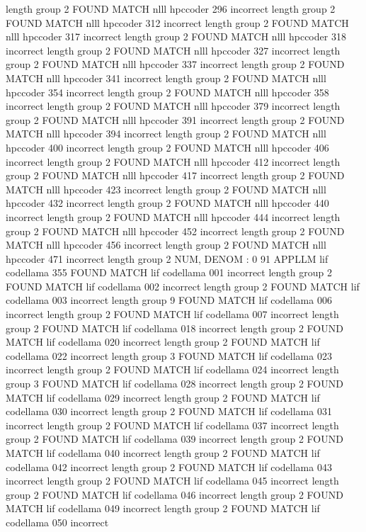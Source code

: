 length group  2
FOUND MATCH nlll hpccoder 296 incorrect
length group  2
FOUND MATCH nlll hpccoder 312 incorrect
length group  2
FOUND MATCH nlll hpccoder 317 incorrect
length group  2
FOUND MATCH nlll hpccoder 318 incorrect
length group  2
FOUND MATCH nlll hpccoder 327 incorrect
length group  2
FOUND MATCH nlll hpccoder 337 incorrect
length group  2
FOUND MATCH nlll hpccoder 341 incorrect
length group  2
FOUND MATCH nlll hpccoder 354 incorrect
length group  2
FOUND MATCH nlll hpccoder 358 incorrect
length group  2
FOUND MATCH nlll hpccoder 379 incorrect
length group  2
FOUND MATCH nlll hpccoder 391 incorrect
length group  2
FOUND MATCH nlll hpccoder 394 incorrect
length group  2
FOUND MATCH nlll hpccoder 400 incorrect
length group  2
FOUND MATCH nlll hpccoder 406 incorrect
length group  2
FOUND MATCH nlll hpccoder 412 incorrect
length group  2
FOUND MATCH nlll hpccoder 417 incorrect
length group  2
FOUND MATCH nlll hpccoder 423 incorrect
length group  2
FOUND MATCH nlll hpccoder 432 incorrect
length group  2
FOUND MATCH nlll hpccoder 440 incorrect
length group  2
FOUND MATCH nlll hpccoder 444 incorrect
length group  2
FOUND MATCH nlll hpccoder 452 incorrect
length group  2
FOUND MATCH nlll hpccoder 456 incorrect
length group  2
FOUND MATCH nlll hpccoder 471 incorrect
length group  2
NUM, DENOM : 0 91
APPLLM lif codellama
355
FOUND MATCH lif codellama 001 incorrect
length group  2
FOUND MATCH lif codellama 002 incorrect
length group  2
FOUND MATCH lif codellama 003 incorrect
length group  9
FOUND MATCH lif codellama 006 incorrect
length group  2
FOUND MATCH lif codellama 007 incorrect
length group  2
FOUND MATCH lif codellama 018 incorrect
length group  2
FOUND MATCH lif codellama 020 incorrect
length group  2
FOUND MATCH lif codellama 022 incorrect
length group  3
FOUND MATCH lif codellama 023 incorrect
length group  2
FOUND MATCH lif codellama 024 incorrect
length group  3
FOUND MATCH lif codellama 028 incorrect
length group  2
FOUND MATCH lif codellama 029 incorrect
length group  2
FOUND MATCH lif codellama 030 incorrect
length group  2
FOUND MATCH lif codellama 031 incorrect
length group  2
FOUND MATCH lif codellama 037 incorrect
length group  2
FOUND MATCH lif codellama 039 incorrect
length group  2
FOUND MATCH lif codellama 040 incorrect
length group  2
FOUND MATCH lif codellama 042 incorrect
length group  2
FOUND MATCH lif codellama 043 incorrect
length group  2
FOUND MATCH lif codellama 045 incorrect
length group  2
FOUND MATCH lif codellama 046 incorrect
length group  2
FOUND MATCH lif codellama 049 incorrect
length group  2
FOUND MATCH lif codellama 050 incorrect
